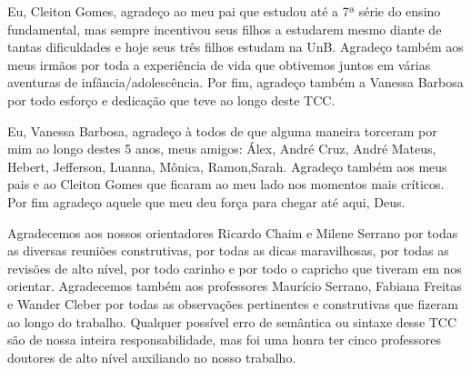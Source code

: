 \begin{agradecimentos}
Eu, Cleiton Gomes, agradeço ao meu pai que estudou até a 7ª série do ensino fundamental, mas sempre incentivou seus filhos a estudarem mesmo diante de tantas dificuldades e hoje seus três filhos estudam na UnB. Agradeço também aos meus irmãos por toda a experiência de vida que obtivemos juntos em várias aventuras de infância/adolescência. Por fim, agradeço também a Vanessa Barbosa por todo esforço e dedicação que teve ao longo deste TCC.

Eu, Vanessa Barbosa, agradeço à todos de que alguma maneira torceram por mim ao longo destes 5 anos, meus amigos: Álex, André Cruz, André Mateus, Hebert, Jefferson, Luanna, Mônica, Ramon,Sarah. Agradeço também aos meus pais e ao Cleiton Gomes que ficaram ao meu lado nos momentos mais críticos. Por fim agradeço aquele que meu deu força para chegar até aqui, Deus.

Agradecemos aos nossos orientadores Ricardo Chaim e Milene Serrano por todas as diversas reuniões construtivas, por todas as dicas maravilhosas, por todas as revisões de alto nível, por todo carinho e por todo o capricho que tiveram em nos orientar. Agradecemos também aos professores Maurício Serrano, Fabiana Freitas e Wander Cleber por todas as observações pertinentes e construtivas que fizeram ao longo do trabalho. Qualquer possível erro de semântica ou sintaxe desse TCC são de nossa inteira responsabilidade, mas foi uma honra ter cinco professores doutores de alto nível auxiliando no nosso trabalho.

\end{agradecimentos}
